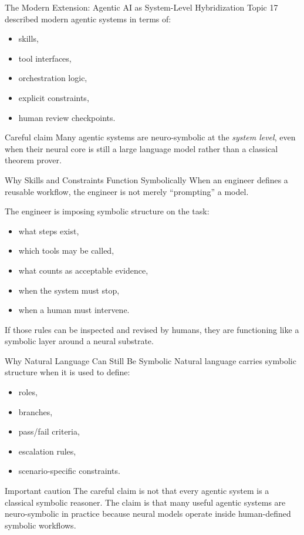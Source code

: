 \documentclass[12pt]{beamer}
\begin{document}
\begin{frame}{The Modern Extension: Agentic AI as System-Level Hybridization}
  Topic 17 described modern agentic systems in terms of:
  \begin{itemize}
    \item skills,
    \item tool interfaces,
    \item orchestration logic,
    \item explicit constraints,
    \item human review checkpoints.
  \end{itemize}

  \begin{conceptbox}{Careful claim}
    Many agentic systems are neuro-symbolic at the \emph{system level}, even when their neural core is still a large language model rather than a classical theorem prover.
  \end{conceptbox}
\end{frame}

\begin{frame}{Why Skills and Constraints Function Symbolically}
  When an engineer defines a reusable workflow, the engineer is not merely ``prompting'' a model.

  The engineer is imposing symbolic structure on the task:
  \begin{itemize}
    \item what steps exist,
    \item which tools may be called,
    \item what counts as acceptable evidence,
    \item when the system must stop,
    \item when a human must intervene.
  \end{itemize}

  If those rules can be inspected and revised by humans, they are functioning like a symbolic layer around a neural substrate.
\end{frame}

\begin{frame}{Why Natural Language Can Still Be Symbolic}
  Natural language carries symbolic structure when it is used to define:
  \begin{itemize}
    \item roles,
    \item branches,
    \item pass/fail criteria,
    \item escalation rules,
    \item scenario-specific constraints.
  \end{itemize}

  \begin{warningbox}{Important caution}
    The careful claim is not that every agentic system is a classical symbolic reasoner. The claim is that many useful agentic systems are neuro-symbolic in practice because neural models operate inside human-defined symbolic workflows.
  \end{warningbox}
\end{frame}
\end{document}

